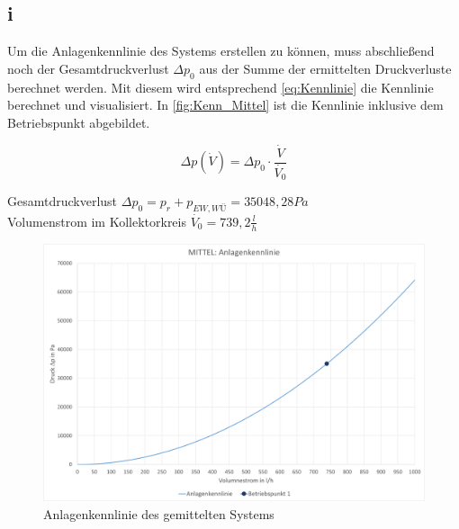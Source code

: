 \subsection{i}
Um die Anlagenkennlinie des Systems erstellen zu können, muss abschließend noch der
Gesamtdruckverlust $\Delta p_0$ aus der Summe der ermittelten Druckverluste berechnet werden.
Mit diesem wird entsprechend \autoref{eq:Kennlinie} die Kennlinie berechnet und visualisiert.
In \autoref{fig:Kenn_Mittel} ist die Kennlinie inklusive dem Betriebspunkt abgebildet.

\begin{equation}
    \label{eq:Kennlinie}
    \Delta p (\dot{V}) = \Delta p_0  \cdot \frac{\dot{V}}{ \dot{V_0} }
\end{equation}
\vspace{\baselineskip}
\begin{center}
    Gesamtdruckverlust $\Delta p_0 =p_r + p_{EW,WÜ} = 35048,28 Pa$\\
    Volumenstrom im Kollektorkreis $\dot{V_0} = 739,2\frac{l}{h}$
\end{center}
\vspace{\baselineskip}
\begin{figure}[H]
    \centering
    \includegraphics[width=1\textwidth]{Abbildungen/Kennlinie-Mittel.png}
    \caption{Anlagenkennlinie des gemittelten Systems}
    \label{fig:Kenn_Mittel}
\end{figure}